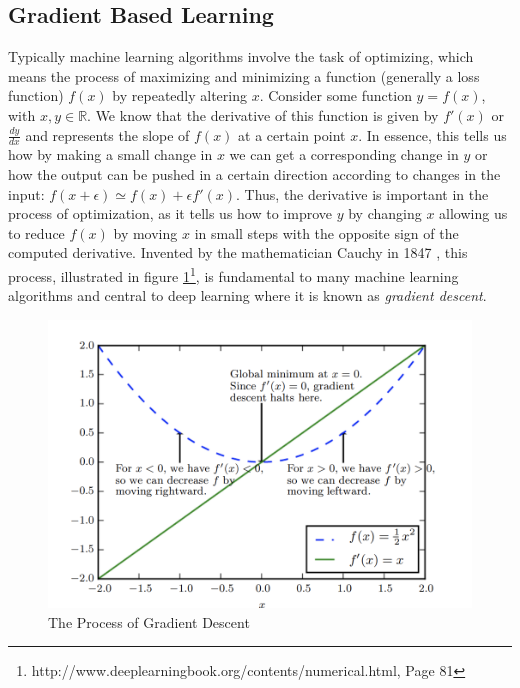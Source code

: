 \documentclass[12pt]{extarticle}
\numberwithin{equation}{section}
\begin{document}
	\subsection{Gradient Based Learning}		
	Typically machine learning algorithms involve the task of optimizing, which means the process of maximizing and minimizing a function (generally a loss function) $f(x)$ by repeatedly altering $x$\cite{Goodfellow-et-al-2016}.
	Consider some function $y = f(x)$, with $x, y \in \mathbb{R}$. We know that the derivative of this function is given by $f'(x) $ or $\frac{dy}{dx}$ and represents the slope of $f(x)$ at a certain point $x$. In essence, this tells us how by making a small change in $x$ we can get a corresponding change in $y$ or how the output can be pushed in a certain direction according to changes in the input: $f(x + \epsilon) \simeq f(x) + \epsilon f'(x)$.  Thus, the derivative is important in the process of optimization, as it tells us how to improve $y$ by changing $x$ allowing us to reduce $f(x)$ by moving $x$ in small steps with the opposite sign of the computed derivative. Invented by the mathematician Cauchy in 1847 \cite{cauchy1847methode}, this process, illustrated in figure \ref{grad_descent}\footnote{http://www.deeplearningbook.org/contents/numerical.html, Page 81}, is fundamental to many machine learning algorithms and central to deep learning where it is known as \textit{gradient descent}.
	\begin{figure}[h]
		\vspace{0.2cm}
		\centering
		\includegraphics[scale=0.8]{grad_descent}
		\caption{The Process of Gradient Descent\cite{Goodfellow-et-al-2016}
			\label{grad_descent}}
	\end{figure}
	\pagebreak
\end{document}
